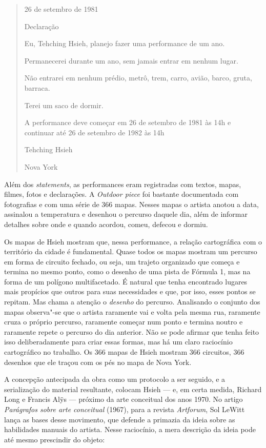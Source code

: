\begin{quote}
26 de setembro de 1981

Declaração

Eu, Tehching Hsieh, planejo fazer uma performance de um ano.

Permanecerei  durante um ano, sem jamais entrar em nenhum
lugar.

Não entrarei em nenhum prédio, metrô, trem, carro, avião, barco, gruta,
barraca.

Terei um saco de dormir.

A performance deve começar em 26 de setembro de 1981 às 14h e continuar
até 26 de setembro de 1982 às 14h

Tehching Hsieh

Nova York
\end{quote}

Além dos \emph{statements}, as performances eram registradas com textos,
mapas, filmes, fotos e declarações. A \emph{Outdoor piece} foi bastante
documentada com fotografias e com uma série de 366 mapas. Nesses mapas o
artista anotou a data, assinalou a temperatura e desenhou o percurso
daquele dia, além de informar detalhes sobre onde e quando acordou,
comeu, defecou e dormiu.

Os mapas de Hsieh mostram que, nessa performance, a relação cartográfica
com o território da cidade é fundamental. Quase todos os mapas mostram
um percurso em forma de circuito fechado, ou seja, um trajeto organizado
que começa e termina no mesmo ponto, como o desenho de uma pista de
Fórmula 1, mas na forma de um polígono multifacetado. É natural que
tenha encontrado lugares mais propícios que outros para suas
necessidades e que, por isso, esses pontos se repitam. Mas chama a
atenção o \emph{desenho} do percurso. Analisando o conjunto dos mapas
observa"-se que o artista raramente vai e volta pela mesma rua,
raramente cruza o próprio percurso, raramente começar num ponto e
termina noutro e raramente repete o percurso do dia anterior. Não se
pode afirmar que tenha feito isso deliberadamente para criar essas
formas, mas há um claro raciocínio cartográfico no trabalho. Os 366
mapas de Hsieh mostram 366 circuitos, 366 desenhos que ele traçou com os
pés no mapa de Nova York.

A concepção antecipada da obra como um protocolo a ser seguido, e a
serialização do material resultante, colocam Hsieh --- e, em certa
medida, Richard Long e Francis Alÿs --- próximo da arte conceitual dos
anos 1970. No artigo \emph{Parágrafos sobre arte conceitual} (1967),
para a revista \emph{Artforum}, Sol LeWitt lança as bases desse
movimento, que defende a primazia da ideia sobre as habilidades manuais
do artista. Nesse raciocínio, a mera descrição da ideia pode até mesmo
prescindir do objeto:

